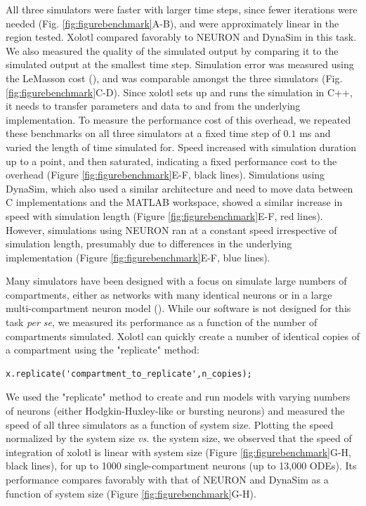 \documentclass{frontiersSCNS} %
\begin{document}
All three simulators were faster with larger time steps, since fewer iterations were needed (Fig. \ref{fig:figurebenchmark}A-B), and were approximately linear in the region tested. Xolotl compared favorably to NEURON and DynaSim in this task. We also measured the quality of the simulated output by comparing it to the simulated output at the smallest time step. Simulation error was measured using the LeMasson cost (\cite{lemassonIntroductionEquationSolving2000}), and was comparable amongst the three simulators (Fig. \ref{fig:figurebenchmark}C-D). Since xolotl sets up and runs the simulation in C++, it needs to transfer parameters and data to and from the underlying implementation. To measure the performance cost of this overhead, we repeated these benchmarks on all three simulators at a fixed time step of $0.1$ ms and varied the length of time simulated for. Speed increased with simulation duration up to a point, and then saturated, indicating a fixed performance cost to the overhead (Figure \ref{fig:figurebenchmark}E-F, black lines). Simulations using DynaSim, which also used a similar architecture and need to move data between C implementations and the MATLAB workspace, showed a similar increase in speed with simulation length (Figure \ref{fig:figurebenchmark}E-F, red lines). However, simulations using NEURON ran at a constant speed irrespective of simulation length, presumably due to differences in the underlying implementation (Figure \ref{fig:figurebenchmark}E-F, blue lines).

Many simulators have been designed with a focus on simulate large numbers of compartments, either as networks with many identical neurons or in a large multi-compartment neuron model (\cite{bretteSimulationNetworksSpiking2007, sherfeyDynaSimMATLABToolbox2018, vitayANNarchyCodeGeneration2015, delormeSpikeNETEventdrivenSimulation2003}). While our software is not designed for this task {\em per se}, we measured its performance as a function of the number of compartments simulated. Xolotl can quickly create a number of identical copies of a compartment using the "replicate" method:

\begin{lstlisting}[style=Matlab-editor]
x.replicate('compartment_to_replicate',n_copies);
\end{lstlisting}

We used the "replicate" method to create and run models with varying numbers of neurons (either Hodgkin-Huxley-like or bursting neurons) and measured the speed of all three simulators as a function of system size. Plotting the speed normalized by the system size {\em vs.} the system size, we observed that the speed of integration of xolotl is linear with system size (Figure \ref{fig:figurebenchmark}G-H, black lines), for up to 1000 single-compartment neurons (up to 13,000 ODEs). Its performance compares favorably with that of NEURON and DynaSim as a function of system size (Figure \ref{fig:figurebenchmark}G-H).
\end{document}
